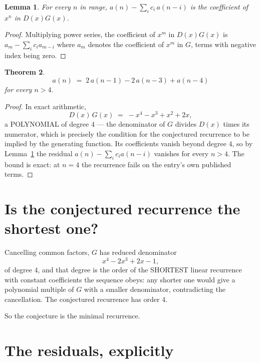 \documentclass[11pt,a4paper]{article}
\theoremstyle{plain}
\newtheorem{theorem}{Theorem}
\newtheorem{lemma}[theorem]{Lemma}
\theoremstyle{definition}
\begin{document}
\begin{lemma}\label{lem:key}
For every $n$ in range, $a(n)-\sum_i c_i\,a(n-i)$ is the coefficient of $x^{n}$ in
$D(x)G(x)$.
\end{lemma}

\begin{proof}
Multiplying power series, the coefficient of $x^{m}$ in $D(x)G(x)$ is
$a_m-\sum_i c_i a_{m-i}$ where $a_m$ denotes the coefficient of $x^{m}$ in $G$, terms with
negative index being zero.
\end{proof}

\begin{theorem}
\[
a(n)\;=\;2\,a(n-1) - 2\,a(n-3) + a(n-4)
\]
for every $n>4$.
\end{theorem}

\begin{proof}
In exact arithmetic,
\[
D(x)\,G(x)\;=\;- x^{4} - x^{3} + x^{2} + 2 x,
\]
a POLYNOMIAL of degree $4$ --- the denominator of $G$ divides $D(x)$ times its numerator,
which is precisely the condition for the conjectured recurrence to be implied by the
generating function. Its coefficients vanish beyond degree $4$, so by
Lemma~\ref{lem:key} the residual $a(n)-\sum_ic_ia(n-i)$ vanishes for every
$n>4$. The bound is exact: at $n=4$ the recurrence fails on the entry's own published terms.
\end{proof}

\section{Is the conjectured recurrence the shortest one?}

Cancelling common factors, $G$ has reduced denominator
\[
x^{4} - 2 x^{3} + 2 x - 1,
\]
of degree $4$, and that degree is the order of the SHORTEST linear recurrence with
constant coefficients the sequence obeys: any shorter one would give a polynomial multiple of
$G$ with a smaller denominator, contradicting the cancellation. The conjectured recurrence has
order $4$.

So the conjecture is the minimal recurrence.

\section{The residuals, explicitly}
\end{document}
